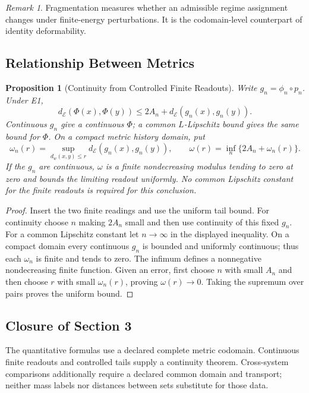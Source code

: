 \documentclass[11pt,a4paper]{article}
\theoremstyle{plain}
\newtheorem{proposition}[theorem]{Proposition}
\theoremstyle{definition}
\theoremstyle{remark}
\newtheorem{remark}[theorem]{Remark}
\begin{document}
\begin{remark}
Fragmentation measures whether an admissible regime assignment changes under finite-energy perturbations. It is the codomain-level counterpart of identity deformability.
\end{remark}

\subsection{Relationship Between Metrics}

\begin{proposition}[Continuity from Controlled Finite Readouts]\label{prop:metric-compat}
Write $g_n=\phi_n\circ p_n$. Under E1,
\[
d_{\mathcal E}(\Phi(x),\Phi(y))\leq2A_n+d_{\mathcal E}(g_n(x),g_n(y)).
\]
Continuous $g_n$ give a continuous $\Phi$; a common $L$-Lipschitz bound gives
the same bound for $\Phi$. On a compact metric history domain, put
\[
 \omega_n(r)=\sup_{d_w(x,y)\leq r}d_{\mathcal E}(g_n(x),g_n(y)),\qquad
 \omega(r)=\inf_n\{2A_n+\omega_n(r)\}.
\]
If the $g_n$ are continuous, $\omega$ is a finite nondecreasing modulus tending
to zero at zero and bounds the limiting readout uniformly. No common
Lipschitz constant for the finite readouts is required for this conclusion.
\end{proposition}
\begin{proof}
Insert the two finite readings and use the uniform tail bound. For continuity
choose $n$ making $2A_n$ small and then use continuity of this fixed $g_n$.
For a common Lipschitz constant let $n\to\infty$ in the displayed inequality.
On a compact domain every continuous $g_n$ is bounded and uniformly continuous;
thus each $\omega_n$ is finite and tends to zero. The infimum defines a
nonnegative nondecreasing finite function. Given an error, first choose $n$
with small $A_n$ and then choose $r$ with small $\omega_n(r)$, proving
$\omega(r)\to0$. Taking the supremum over pairs proves the uniform bound.
\end{proof}

\subsection{Closure of Section 3}
The quantitative formulas use a declared complete metric codomain. Continuous finite readouts and controlled tails supply a continuity theorem. Cross-system comparisons additionally require a declared common domain and transport; neither mass labels nor distances between sets substitute for those data.
\end{document}
